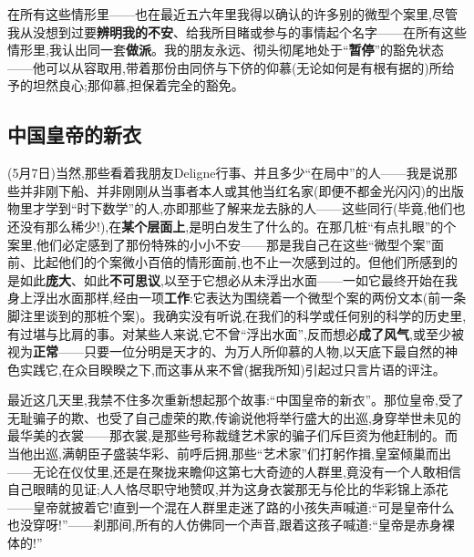 在所有这些情形里——也在最近五六年里我得以确认的许多别的微型个案里,尽管我从没想到过要\textbf{辨明我的不安}、给我所目睹或参与的事情起个名字——在所有这些情形里,我认出同一套\textbf{做派}。我的朋友永远、彻头彻尾地处于“\textbf{暂停}”的豁免状态——他可以从容取用,带着那份由同侪与下侪的仰慕(无论如何是有根有据的)所给予的坦然良心;那仰慕,担保着完全的豁免。

\subsection{中国皇帝的新衣}


\dmark{}(5月7日)当然,那些看着我朋友Deligne行事、并且多少“在局中”的人——我是说那些并非刚下船、并非刚刚从当事者本人或其他当红名家(即便不都金光闪闪)的出版物里才学到“时下数学”的人,亦即那些了解来龙去脉的人——这些同行(毕竟,他们也还没有那么稀少!),在\textbf{某个层面上},是明白发生了什么的。在那几桩“有点扎眼”的个案里,他们必定感到了那份特殊的小小不安——那是我自己在这些“微型个案”面前、比起他们的个案微小百倍的情形面前,也不止一次感到过的。但他们所感到的是如此\textbf{庞大}、如此\textbf{不可思议},以至于它想必从未浮出水面——一如它最终开始在我身上浮出水面那样,经由一项\textbf{工作}:它表达为围绕着一个微型个案的两份文本(前一条脚注里谈到的那桩个案)。我确实没有听说,在我们的科学或任何别的科学的历史里,有过堪与比肩的事。对某些人来说,它不曾“浮出水面”,反而想必\textbf{成了风气},或至少被视为\textbf{正常}——只要一位分明是天才的、为万人所仰慕的人物,以天底下最自然的神色实践它,在众目睽睽之下,而这事从来不曾(据我所知)引起过只言片语的评注。

最近这几天里,我禁不住多次重新想起那个故事:“中国皇帝的新衣”。那位皇帝,受了无耻骗子的欺、也受了自己虚荣的欺,传谕说他将举行盛大的出巡,身穿举世未见的最华美的衣裳——那衣裳,是那些号称裁缝艺术家的骗子们斥巨资为他赶制的。而当他出巡,满朝臣子盛装华彩、前呼后拥,那些“艺术家”们打躬作揖,皇室倾巢而出——无论在仪仗里,还是在聚拢来瞻仰这第七大奇迹的人群里,竟没有一个人敢相信自己眼睛的见证;人人恪尽职守地赞叹,并为这身衣裳那无与伦比的华彩锦上添花——皇帝就披着它!直到一个混在人群里走迷了路的小孩失声喊道:“可是皇帝什么也没穿呀!”——刹那间,所有的人仿佛同一个声音,跟着这孩子喊道:“皇帝是赤身裸体的!”

